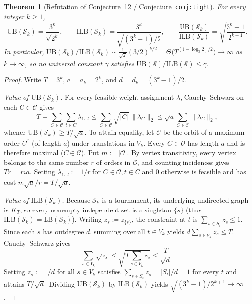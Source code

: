 \documentclass[11pt]{article}
\theoremstyle{plain}
\newtheorem{theorem}{Theorem}
\theoremstyle{definition}
\theoremstyle{remark}
\newcommand{\UB}{\mathrm{UB}}
\newcommand{\ILB}{\mathrm{ILB}}
\newcommand{\LB}{\mathrm{LB}}
\begin{document}
\begin{theorem}[Refutation of Conjecture~12 / Conjecture~\texttt{conj:tight}]\label{thm:sep}
For every integer $k \ge 1$,
\[
\UB(\mathcal{S}_k) = \frac{3^k}{\sqrt{2^k}}, \qquad
\ILB(\mathcal{S}_k) = \frac{3^k}{\sqrt{(3^k - 1)/2}}, \qquad
\frac{\UB(\mathcal{S}_k)}{\ILB(\mathcal{S}_k)} = \sqrt{\frac{3^k - 1}{2^{k+1}}}.
\]
In particular, $\UB(\mathcal{S}_k) / \ILB(\mathcal{S}_k) \sim \frac{1}{\sqrt{2}}(3/2)^{k/2} = \Theta\!\bigl(T^{(1 - \log_3 2)/2}\bigr) \to \infty$ as $k \to \infty$, so no universal constant $\gamma$ satisfies $\UB(\mathcal{S}) / \ILB(\mathcal{S}) \le \gamma$.
\end{theorem}

\begin{proof}
Write $T = 3^k$, $a = a_k = 2^k$, and $d = d_k = (3^k - 1)/2$.

\emph{Value of $\UB(\mathcal{S}_k)$.}
For every feasible weight assignment $\lambda$, Cauchy--Schwarz on each $C \in \mathcal{C}$ gives
\[
T = \sum_{C \in \mathcal{C}} \sum_{t \in C} \lambda_{C, t}
\le \sum_{C \in \mathcal{C}} \sqrt{|C|}\,\|\lambda_C\|_2
\le \sqrt{a} \sum_{C \in \mathcal{C}} \|\lambda_C\|_2,
\]
whence $\UB(\mathcal{S}_k) \ge T/\sqrt{a}$.
To attain equality, let $\mathcal{O}$ be the orbit of a maximum order $C^*$ (of length $a$) under translations in $V_k$. Every $C \in \mathcal{O}$ has length $a$ and is therefore maximal ($C \in \mathcal{C}$). Put $m := |\mathcal{O}|$. By vertex transitivity, every vertex belongs to the same number $r$ of orders in $\mathcal{O}$, and counting incidences gives $T r = m a$. Setting $\lambda_{C, t} := 1/r$ for $C \in \mathcal{O}, t \in C$ and $0$ otherwise is feasible and has cost $m\sqrt{a}/r = T/\sqrt{a}$.

\emph{Value of $\ILB(\mathcal{S}_k)$.}
Because $\mathcal{S}_k$ is a tournament, its underlying undirected graph is $K_T$, so every nonempty independent set is a singleton $\{s\}$ (thus $\ILB(\mathcal{S}_k) = \LB(\mathcal{S}_k)$). Writing $z_s := z_{\{s\}}$, the constraint at $t$ is $\sum_{s \in S_t} z_s \le 1$. Since each $s$ has outdegree $d$, summing over all $t \in V_k$ yields $d \sum_{s \in V_k} z_s \le T$. Cauchy--Schwarz gives
\[
\sum_{s \in V_k} \sqrt{z_s} \le \sqrt{T \sum_{s \in V_k} z_s} \le \frac{T}{\sqrt{d}}.
\]
Setting $z_s := 1/d$ for all $s \in V_k$ satisfies $\sum_{s \in S_t} z_s = |S_t|/d = 1$ for every $t$ and attains $T/\sqrt{d}$. Dividing $\UB(\mathcal{S}_k)$ by $\ILB(\mathcal{S}_k)$ yields $\sqrt{(3^k - 1)/2^{k+1}} \to \infty$.
\end{proof}
\end{document}
